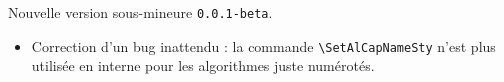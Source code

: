 Nouvelle version sous-mineure \verb+0.0.1-beta+.

\begin{itemize}[itemsep=.5em]
    \item Correction d'un bug inattendu : la commande \verb#\SetAlCapNameSty# n'est plus utilisée en interne pour les algorithmes juste numérotés.


\end{itemize}

\separation

